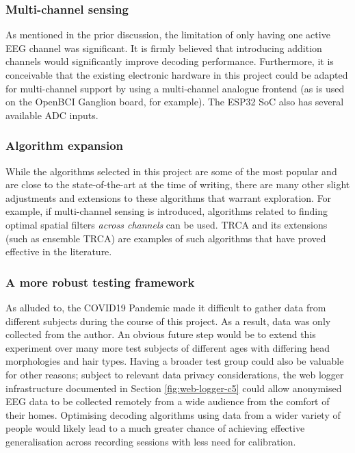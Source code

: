 \subsubsection{Multi-channel sensing}
As mentioned in the prior discussion, the limitation of only having one active EEG channel was significant. It is firmly believed that introducing addition channels would significantly improve decoding performance. Furthermore, it is conceivable that the existing electronic hardware in this project could be adapted for multi-channel support by using a multi-channel analogue frontend (as is used on the OpenBCI Ganglion board, for example). The ESP32 SoC also has several available ADC inputs.

\subsubsection{Algorithm expansion}
While the algorithms selected in this project are some of the most popular and are close to the state-of-the-art at the time of writing, there are many other slight adjustments and extensions to these algorithms that warrant exploration. For example, if multi-channel sensing is introduced, algorithms related to finding optimal spatial filters \textit{across channels} can be used. TRCA and its extensions (such as ensemble TRCA) are examples of such algorithms that have proved effective in the literature. 

\subsubsection{A more robust testing framework}
As alluded to, the COVID19 Pandemic made it difficult to gather data from different subjects during the course of this project. As a result, data was only collected from the author. An obvious future step would be to extend this experiment over many more test subjects of different ages with differing head morphologies and hair types. Having a broader test group could also be valuable for other reasons; subject to relevant data privacy considerations, the web logger infrastructure documented in Section \ref{fig:web-logger-c5} could allow anonymised EEG data to be collected remotely from a wide audience from the comfort of their homes. Optimising decoding algorithms using data from a wider variety of people would likely lead to a much greater chance of achieving effective generalisation across recording sessions with less need for calibration. 

